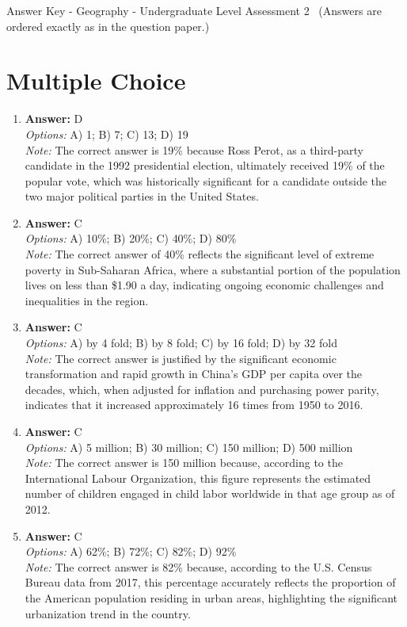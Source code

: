 \documentclass[12pt]{article}
\begin{document}
\begin{center}
Answer Key - Geography - Undergraduate Level Assessment 2 \
\small (Answers are ordered exactly as in the question paper.)
\end{center}

\section*{Multiple Choice}
\begin{enumerate}[label=\arabic*.]
\item \textbf{Answer:} D
\\ \textit{Options:} A) 1; B) 7; C) 13; D) 19
\\ \textit{Note:} The correct answer is 19\% because Ross Perot, as a third-party candidate in the 1992 presidential election, ultimately received 19\% of the popular vote, which was historically significant for a candidate outside the two major political parties in the United States.
\item \textbf{Answer:} C
\\ \textit{Options:} A) 10\%; B) 20\%; C) 40\%; D) 80\%
\\ \textit{Note:} The correct answer of 40\% reflects the significant level of extreme poverty in Sub-Saharan Africa, where a substantial portion of the population lives on less than \$1.90 a day, indicating ongoing economic challenges and inequalities in the region.
\item \textbf{Answer:} C
\\ \textit{Options:} A) by 4 fold; B) by 8 fold; C) by 16 fold; D) by 32 fold
\\ \textit{Note:} The correct answer is justified by the significant economic transformation and rapid growth in China's GDP per capita over the decades, which, when adjusted for inflation and purchasing power parity, indicates that it increased approximately 16 times from 1950 to 2016.
\item \textbf{Answer:} C
\\ \textit{Options:} A) 5 million; B) 30 million; C) 150 million; D) 500 million
\\ \textit{Note:} The correct answer is 150 million because, according to the International Labour Organization, this figure represents the estimated number of children engaged in child labor worldwide in that age group as of 2012.
\item \textbf{Answer:} C
\\ \textit{Options:} A) 62\%; B) 72\%; C) 82\%; D) 92\%
\\ \textit{Note:} The correct answer is 82\% because, according to the U.S. Census Bureau data from 2017, this percentage accurately reflects the proportion of the American population residing in urban areas, highlighting the significant urbanization trend in the country.
\end{enumerate}
\end{document}
